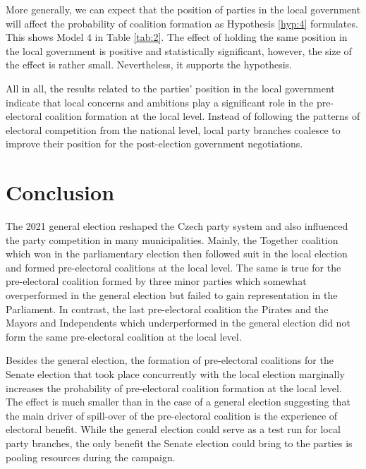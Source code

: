 \documentclass[fignum,12pt,titlepage]{article}
\begin{document}
More generally, we can expect that the position of parties in the local government will affect the probability of coalition formation as Hypothesis \ref{hyp:4} formulates. This shows Model 4 in Table \ref{tab:2}. The effect of holding the same position in the local government is positive and statistically significant, however, the size of the effect is rather small. Nevertheless, it supports the hypothesis.

All in all, the results related to the parties' position in the local government indicate that local concerns and ambitions play a significant role in the pre-electoral coalition formation at the local level. Instead of following the patterns of electoral competition from the national level, local party branches coalesce to improve their position for the post-election government negotiations.




\section{Conclusion}

The 2021 general election reshaped the Czech party system and also influenced the party competition in many municipalities. Mainly, the Together coalition which won in the parliamentary election then followed suit in the local election and formed pre-electoral coalitions at the local level. The same is true for the pre-electoral coalition formed by three minor parties which somewhat overperformed in the general election but failed to gain representation in the Parliament. In contrast, the last pre-electoral coalition the Pirates and the Mayors and Independents which underperformed in the general election did not form the same pre-electoral coalition at the local level.

Besides the general election, the formation of pre-electoral coalitions for the Senate election that took place concurrently with the local election marginally increases the probability of pre-electoral coalition formation at the local level. The effect is much smaller than in the case of a general election suggesting that the main driver of spill-over of the pre-electoral coalition is the experience of electoral benefit. While the general election could serve as a test run for local party branches, the only benefit the Senate election could bring to the parties is pooling resources during the campaign.
\end{document}
